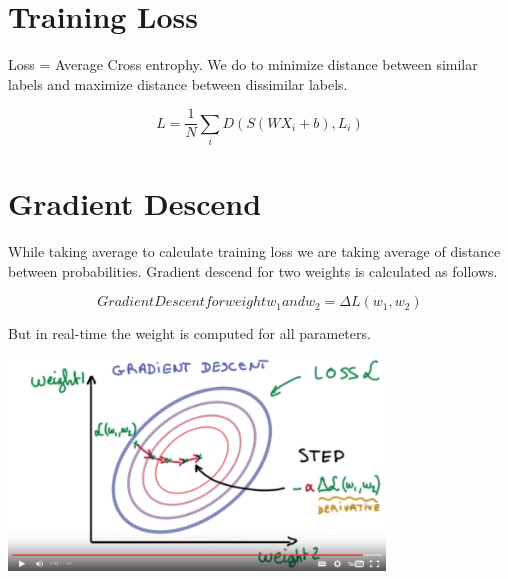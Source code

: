 \documentclass[a4paper,10pt]{article}
\begin{document}
\section{Training Loss}

Loss = Average Cross entrophy. We do  to minimize distance between similar labels and maximize distance between dissimilar labels.

\begin{equation}
 L=\frac{1}{N}{\displaystyle \sum_i D(S(WX_i + b),L_i) }
\end{equation}


\section{Gradient Descend}

While taking average to calculate training loss we are taking average of distance between probabilities. Gradient descend for two weights is calculated as follows.


\begin{equation}
 Gradient Descent for weight w_1 and w_2 = \Delta L(w_1,w_2)
\end{equation}


But in real-time the weight is computed for all parameters.





\includegraphics[width=10cm, height=5 cm]{gradientDescend}
\end{document}
